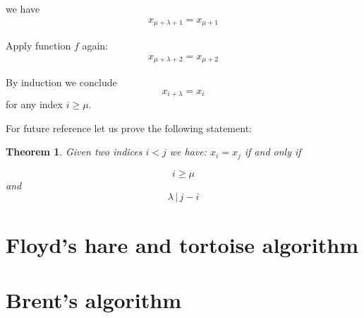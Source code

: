 \documentclass[12pt,a4paper]{article}
\theoremstyle{plain}
\newtheorem{mytheo} {Theorem}
\begin{document}
we have
\begin{gather}
x_{\mu + \lambda + 1} = x_{\mu + 1}
\end{gather}

Apply function $ f $ again:
\begin{gather}
x_{\mu + \lambda + 2} = x_{\mu + 2}
\end{gather}

By induction we conclude
\begin{equation}\label{eq:period}
x_{i + \lambda} = x_{i}
\end{equation}
for any index $ i \geq \mu $.

For future reference let us prove the following statement:

\begin{mytheo}
Given two indices $ i < j $ we have: $ x_i = x_j $ if and only if

\begin{equation}
i \geq \mu
\end{equation}
and
\begin{equation}
\lambda \, | \, j - i
\end{equation}

\end{mytheo}


\section{Floyd's hare and tortoise algorithm}

\section{Brent's algorithm}
\end{document}
